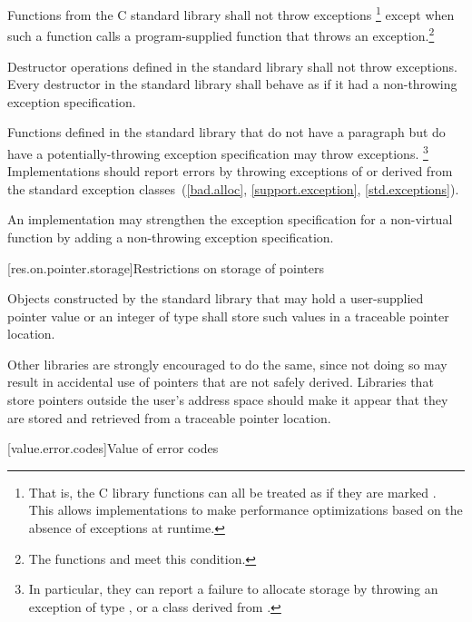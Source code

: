 \pnum
Functions from the C standard library shall not throw exceptions%
\footnote{That is, the C
library functions can all be treated as if they
are marked .
This allows implementations to make performance optimizations
based on the absence of exceptions at runtime.}
except when such a function calls a program-supplied function that throws an
exception.\footnote{The functions
and
 meet this condition.}

\pnum
Destructor operations defined in the \Cpp{} standard library
shall not throw exceptions.
Every destructor in the \Cpp{} standard library shall behave as if it had a
non-throwing exception specification.

\pnum
Functions defined in the
\Cpp{} standard library
%
that do not have a
\throws
paragraph
but do have a potentially-throwing
exception specification
may throw  exceptions.%
\footnote{In particular, they
can report a failure to allocate storage by throwing an exception of type
,
or a class derived from
.}
Implementations should
report errors by throwing exceptions of or derived
from the standard exception classes~(\ref{bad.alloc},
\ref{support.exception}, \ref{std.exceptions}).

\pnum
An implementation may strengthen the
exception specification
for a non-virtual function
by adding a non-throwing exception specification.

[res.on.pointer.storage]{Restrictions on storage of pointers}

\pnum
{}%
%
Objects constructed by the standard library that may hold a user-supplied pointer value
or an integer of type  shall store such values in a traceable
pointer location. \begin{note} Other libraries are
strongly encouraged to do the same, since not doing so may result in accidental use of
pointers that are not safely derived. Libraries that store pointers outside the user's
address space should make it appear that they are stored and retrieved from a traceable
pointer location. \end{note}

[value.error.codes]{Value of error codes}

